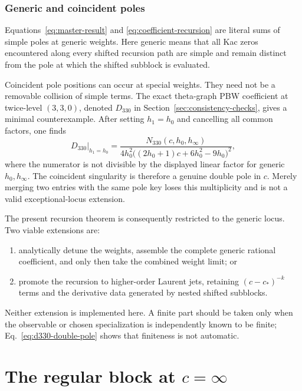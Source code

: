 \documentclass[11pt]{article}
\begin{document}
\subsubsection{Generic and coincident poles}

Equations~\eqref{eq:master-result} and
\eqref{eq:coefficient-recursion} are literal sums of simple poles at generic
weights.  Here generic means that all Kac zeros encountered along every
shifted recursion path are simple and remain distinct from the pole at which
the shifted subblock is evaluated.

Coincident pole positions can occur at special weights.  They need not be a
removable collision of simple terms.  The exact theta-graph PBW coefficient
at twice-level \((3,3,0)\), denoted \(D_{330}\) in
Section~\ref{sec:consistency-checks}, gives a minimal counterexample.  After
setting \(h_1=h_0\) and cancelling all common factors, one finds
\begin{equation}
 D_{330}\big|_{h_1=h_0}
 =\frac{N_{330}(c,h_0,h_\infty)}
 {4h_0^2\bigl((2h_0+1)c+6h_0^2-9h_0\bigr)^2},
 \label{eq:d330-double-pole}
\end{equation}
where the numerator is not divisible by the displayed linear factor for
generic \(h_0,h_\infty\).  The coincident singularity is therefore a genuine
double pole in \(c\).  Merely merging two entries with the same pole key loses
this multiplicity and is not a valid exceptional-locus extension.

The present recursion theorem is consequently restricted to the generic
locus.  Two viable extensions are:
\begin{enumerate}
 \item analytically detune the weights, assemble the complete generic rational
 coefficient, and only then take the combined weight limit; or
 \item promote the recursion to higher-order Laurent jets, retaining
 \((c-c_*)^{-k}\) terms and the derivative data generated by nested shifted
 subblocks.
\end{enumerate}
Neither extension is implemented here.  A finite part should be taken only
when the observable or chosen specialization is independently known to be
finite; Eq.~\eqref{eq:d330-double-pole} shows that finiteness is not automatic.


\section{\texorpdfstring{The regular block at \(c=\infty\)}
{The regular block at c=infinity}}
\label{sec:large-c}
\end{document}
